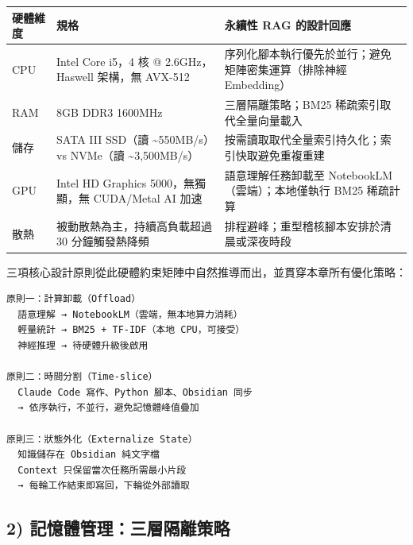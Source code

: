 {\def\LTcaptype{none} %
\begin{longtable}[]{@{}
  >{\raggedright\arraybackslash}p{}
  >{\raggedright\arraybackslash}p{}
  >{\raggedright\arraybackslash}p{}@{}}
\toprule\noalign{}
\begin{minipage}[b]{\linewidth}\raggedright
硬體維度
\end{minipage} & \begin{minipage}[b]{\linewidth}\raggedright
規格
\end{minipage} & \begin{minipage}[b]{\linewidth}\raggedright
永續性 RAG 的設計回應
\end{minipage} \\
\midrule\noalign{}
\endhead
\bottomrule\noalign{}
\endlastfoot
CPU & Intel Core i5，4 核 @ 2.6GHz，Haswell 架構，無 AVX-512 &
序列化腳本執行優先於並行；避免矩陣密集運算（排除神經 Embedding） \\
RAM & 8GB DDR3 1600MHz & 三層隔離策略；BM25 稀疏索引取代全量向量載入 \\
儲存 & SATA III SSD（讀 \textasciitilde550MB/s）vs NVMe（讀
\textasciitilde3,500MB/s） &
按需讀取取代全量索引持久化；索引快取避免重複重建 \\
GPU & Intel HD Graphics 5000，無獨顯，無 CUDA/Metal AI 加速 &
語意理解任務卸載至 NotebookLM（雲端）；本地僅執行 BM25 稀疏計算 \\
散熱 & 被動散熱為主，持續高負載超過 30 分鐘觸發熱降頻 &
排程避峰；重型稽核腳本安排於清晨或深夜時段 \\
\end{longtable}
}

三項核心設計原則從此硬體約束矩陣中自然推導而出，並貫穿本章所有優化策略：

\begin{verbatim}
原則一：計算卸載（Offload）
  語意理解 → NotebookLM（雲端，無本地算力消耗）
  輕量統計 → BM25 + TF-IDF（本地 CPU，可接受）
  神經推理 → 待硬體升級後啟用

原則二：時間分割（Time-slice）
  Claude Code 寫作、Python 腳本、Obsidian 同步
  → 依序執行，不並行，避免記憶體峰值疊加

原則三：狀態外化（Externalize State）
  知識儲存在 Obsidian 純文字檔
  Context 只保留當次任務所需最小片段
  → 每輪工作結束即寫回，下輪從外部讀取
\end{verbatim}

\subsection{2)
記憶體管理：三層隔離策略}\label{ux8a18ux61b6ux9ad4ux7ba1ux7406ux4e09ux5c64ux9694ux96e2ux7b56ux7565}

